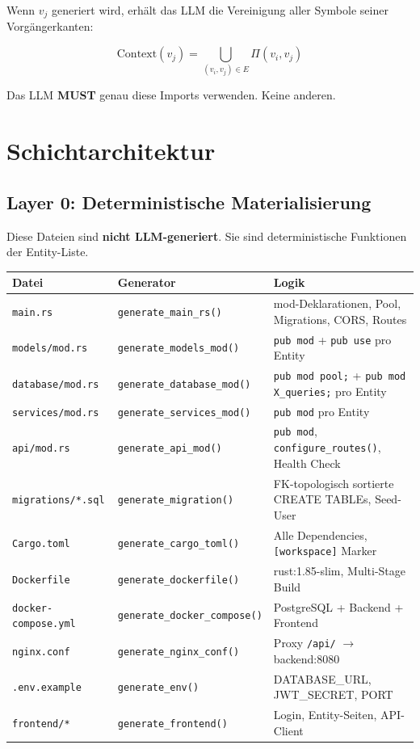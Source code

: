 \documentclass[11pt,a4paper]{article}
\newcommand{\must}{\textbf{MUST}}
\begin{document}
Wenn $v_j$ generiert wird, erhält das LLM die Vereinigung aller
Symbole seiner Vorgängerkanten:

\begin{equation}
\text{Context}(v_j) = \bigcup_{(v_i, v_j) \in E} \Pi(v_i, v_j)
\end{equation}

Das LLM \must{} genau diese Imports verwenden. Keine anderen.

\section{Schichtarchitektur}

\subsection{Layer 0: Deterministische Materialisierung}

Diese Dateien sind \textbf{nicht LLM-generiert}. Sie sind
deterministische Funktionen der Entity-Liste.

\begin{center}
\scriptsize
\begin{tabular}{llp{6cm}}
\toprule
\textbf{Datei} & \textbf{Generator} & \textbf{Logik} \\
\midrule
\texttt{main.rs} & \texttt{generate\_main\_rs()} & mod-Deklarationen, Pool, Migrations, CORS, Routes \\
\texttt{models/mod.rs} & \texttt{generate\_models\_mod()} & \texttt{pub mod} + \texttt{pub use} pro Entity \\
\texttt{database/mod.rs} & \texttt{generate\_database\_mod()} & \texttt{pub mod pool;} + \texttt{pub mod X\_queries;} pro Entity \\
\texttt{services/mod.rs} & \texttt{generate\_services\_mod()} & \texttt{pub mod} pro Entity \\
\texttt{api/mod.rs} & \texttt{generate\_api\_mod()} & \texttt{pub mod}, \texttt{configure\_routes()}, Health Check \\
\texttt{migrations/*.sql} & \texttt{generate\_migration()} & FK-topologisch sortierte CREATE TABLEs, Seed-User \\
\texttt{Cargo.toml} & \texttt{generate\_cargo\_toml()} & Alle Dependencies, \texttt{[workspace]} Marker \\
\texttt{Dockerfile} & \texttt{generate\_dockerfile()} & rust:1.85-slim, Multi-Stage Build \\
\texttt{docker-compose.yml} & \texttt{generate\_docker\_compose()} & PostgreSQL + Backend + Frontend \\
\texttt{nginx.conf} & \texttt{generate\_nginx\_conf()} & Proxy \texttt{/api/} $\to$ backend:8080 \\
\texttt{.env.example} & \texttt{generate\_env()} & DATABASE\_URL, JWT\_SECRET, PORT \\
\texttt{frontend/*} & \texttt{generate\_frontend()} & Login, Entity-Seiten, API-Client \\
\bottomrule
\end{tabular}
\end{center}
\end{document}
